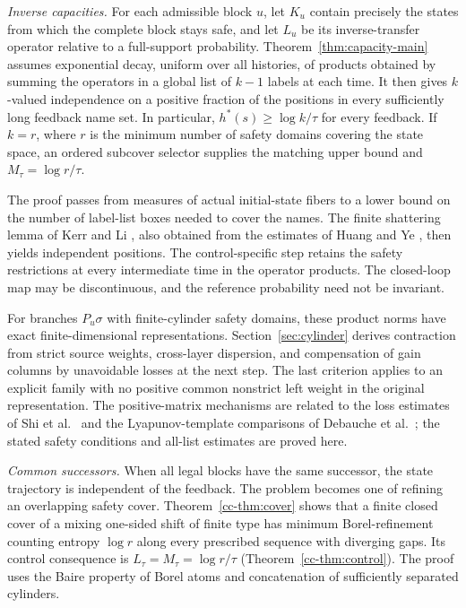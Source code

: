 \documentclass[11pt,reqno]{amsart}
\numberwithin{equation}{section}
\theoremstyle{definition}
\begin{document}
\emph{Inverse capacities.}
For each admissible block $u$, let $K_u$ contain precisely the states
from which the complete block stays safe, and let $L_u$ be its
inverse-transfer operator relative to a full-support probability.
Theorem~\ref{thm:capacity-main} assumes exponential decay, uniform over
all histories, of products obtained by summing the operators in a
global list of $k-1$ labels at each time. It then gives $k$-valued
independence on a positive fraction of the positions in every
sufficiently long feedback name set. In particular,
$h^*(s)\ge\log k/\tau$ for every feedback. If $k=r$, where $r$ is the
minimum number of safety domains covering the state space, an ordered
subcover selector supplies the matching upper bound and
$M_\tau=\log r/\tau$.

The proof passes from measures of actual initial-state fibers to a
lower bound on the number of label-list boxes needed to cover the
names. The finite shattering lemma of Kerr and Li
\cite[Lemma~3.3]{KL2007}, also obtained from the estimates of Huang
and Ye \cite[Lemma~4.1 and Remark~4.2]{HuangYe2009}, then yields
independent positions. The control-specific step retains the safety
restrictions at every intermediate time in the operator products.
The closed-loop map may be discontinuous, and the reference probability
need not be invariant.

For branches $P_u\sigma$ with finite-cylinder safety domains, these
product norms have exact finite-dimensional representations.
Section~\ref{sec:cylinder} derives contraction from strict source
weights, cross-layer dispersion, and compensation of gain columns by
unavoidable losses at the next step. The last criterion applies to
an explicit family with no positive common nonstrict left weight in
the original representation. The positive-matrix mechanisms are related
to the loss estimates of Shi et al.\ \cite{Shi2021} and the
Lyapunov-template comparisons of Debauche et al.\ \cite{Debauche2022};
the stated safety conditions and all-list estimates are proved here.

\emph{Common successors.}
When all legal blocks have the same successor, the state trajectory
is independent of the feedback. The problem becomes one of refining
an overlapping safety cover. Theorem~\ref{cc-thm:cover} shows that a
finite closed cover of a mixing one-sided shift of finite type has
minimum Borel-refinement counting entropy $\log r$ along every
prescribed sequence with diverging gaps. Its control consequence is
$L_\tau=M_\tau=\log r/\tau$
(Theorem~\ref{cc-thm:control}). The proof uses the Baire property of
Borel atoms and concatenation of sufficiently separated cylinders.
\end{document}
